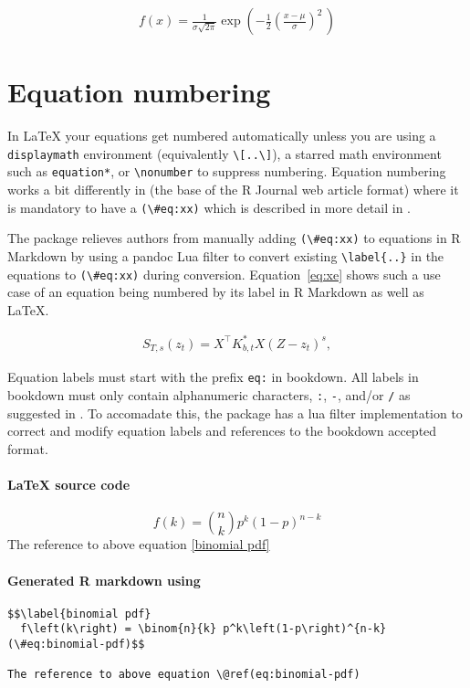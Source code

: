 \begin{align}
\label{eq:1}
f(x) = \frac{1}{\sigma\sqrt{2\pi}} 
  \exp\left( -\frac{1}{2}\left(\frac{x-\mu}{\sigma}\right)^{\!2}\,\right)
\end{align}

\section{Equation numbering}
In LaTeX your equations get numbered automatically unless you are using a \verb|displaymath| environment (equivalently \verb|\[..\]|), a starred math environment such as \verb|equation*|, or \verb|\nonumber| to suppress
numbering. Equation numbering works a bit differently in  (the base of the R Journal web article format) where
it is mandatory to have a \verb|(\#eq:xx)| which is described in more detail in \citet{bookdown}.

The  package relieves authors from manually adding \verb|(\#eq:xx)| to equations in R Markdown
by using a pandoc Lua filter to convert existing \verb|\label{..}| in the equations to \verb|(\#eq:xx)|
during conversion. Equation~\ref{eq:xe} shows such a use case of an equation being numbered by its label in R Markdown
as well as LaTeX.

\begin{align}
S_{T, s}(z_t) = X^{\top} K_{b,t}^* X (Z - z_t)^s, 
\label{eq:xe}
\end{align}

Equation labels must start with the prefix \verb|eq:| in bookdown. All labels in bookdown must only contain alphanumeric characters, \verb|:|, \verb|-|, and/or \verb|/| as suggested in \citep{bookdown}. To accomadate this, the  package has a lua filter implementation to correct and modify equation labels and references to the
bookdown accepted format. 
\paragraph{LaTeX source code}
\begin{example}
\begin{equation}\label{binomial pdf}
  f\left(k\right) = \binom{n}{k} p^k\left(1-p\right)^{n-k}

\end{equation}
The reference to above equation \eqref{binomial pdf}
\end{example}

\paragraph{Generated R markdown using }
\begin{verbatim}
$$\label{binomial pdf}
  f\left(k\right) = \binom{n}{k} p^k\left(1-p\right)^{n-k}   (\#eq:binomial-pdf)$$

The reference to above equation \@ref(eq:binomial-pdf)
\end{verbatim}

